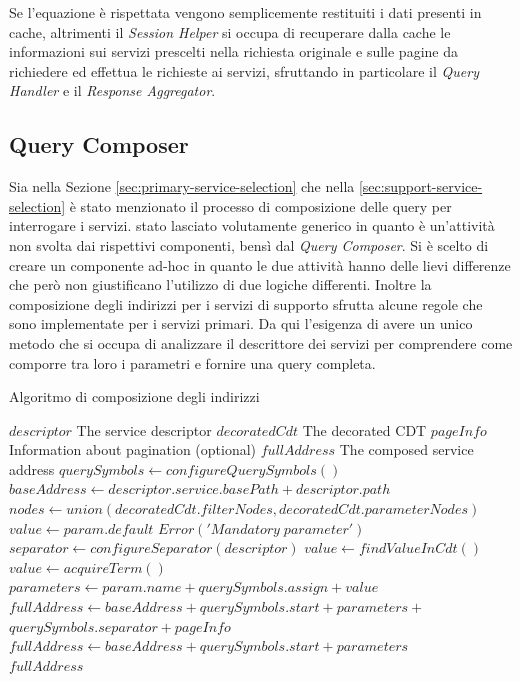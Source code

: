 Se l'equazione è rispettata vengono semplicemente restituiti i dati presenti in cache, altrimenti il \emph{Session Helper} si occupa di recuperare dalla cache le informazioni sui servizi prescelti nella richiesta originale e sulle pagine da richiedere ed effettua le richieste ai servizi, sfruttando in particolare il \emph{Query Handler} e il \emph{Response Aggregator}.

\subsection{Query Composer\label{sec:query-composer}}

Sia nella Sezione \ref{sec:primary-service-selection} che nella \ref{sec:support-service-selection} è stato menzionato il processo di composizione delle query per interrogare i servizi. \upe stato lasciato volutamente generico in quanto è un'attività non svolta dai rispettivi componenti, bensì dal \emph{Query Composer}. Si è scelto di creare un componente ad-hoc in quanto le due attività hanno delle lievi differenze che però non giustificano l'utilizzo di due logiche differenti. Inoltre la composizione degli indirizzi per i servizi di supporto sfrutta alcune regole che sono implementate per i servizi primari. Da qui l'esigenza di avere un unico metodo che si occupa di analizzare il descrittore dei servizi per comprendere come comporre tra loro i parametri e fornire una query completa.

\begin{algorithm}
	\caption{Algoritmo di composizione degli indirizzi}
	\label{alg:algoritmo-composizione-indirizzi}
	\begin{algorithmic}
		\Require
			\Statex $ descriptor $ \Comment The service descriptor
			\Statex $ decoratedCdt $ \Comment The decorated CDT
			\Statex $ pageInfo $ \Comment Information about pagination  (optional)
		\Ensure
			\Statex $ fullAddress $ \Comment The composed service address
		\Statex
		\State $ querySymbols \gets configureQuerySymbols() $
		\State $ baseAddress \gets descriptor.service.basePath + descriptor.path $
		\State $ nodes \gets union(decoratedCdt.filterNodes, decoratedCdt.parameterNodes) $
					\State $ value \gets  param.default  $
				\Else
						\State $ Error('Mandatory\; parameter') $
					\EndIf
				\EndIf
			\Else
				\State $ separator \gets configureSeparator(descriptor) $
					\State $ value \gets findValueInCdt() $
				\Else
					\State $ value \gets acquireTerm() $
				\EndIf
			\EndIf
			\State $ parameters \gets param.name + querySymbols.assign + value  $
		\EndFor
			\State $ fullAddress \gets baseAddress + querySymbols.start + parameters +$
			\State\hspace{\algorithmicindent} $ querySymbols.separator + pageInfo $
		\Else
			\State $ fullAddress \gets baseAddress + querySymbols.start + parameters$
		\EndIf\\
		\Return $ fullAddress $
	\end{algorithmic}
\end{algorithm}

